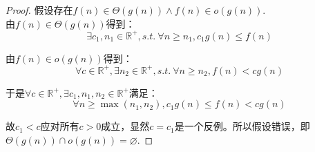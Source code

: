 \begin{proof}
    假设存在$f(n) \in \Theta(g(n)) \wedge f(n) \in o(g(n))$.\\
    
    由$f(n) \in \Theta(g(n))$得到：
    $$\exists c_1,n_1 \in \mathbb R^+, s.t.~
    \forall n \ge n_1, c_1g(n) \le f(n)$$

    由$f(n) \in o(g(n))$得到：
    $$\forall c \in \mathbb R^+, \exists n_2 \in \mathbb R^+, s.t.~
    \forall n \ge n_2, f(n) < cg(n) $$

    于是$\forall c \in \mathbb R^+,\exists c_1,n_1,n_2 \in \mathbb R^+$满足：
    $$\forall n \ge \max(n_1,n_2), c_1g(n) \le f(n) < cg(n)$$
    
    故$c_1<c$应对所有$c>0$成立，显然$c=c_1$是一个反例。所以假设错误，即
    $\Theta(g(n)) \cap o(g(n)) = \varnothing$.
\end{proof}